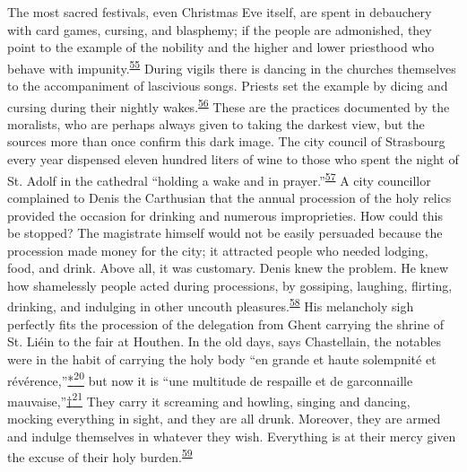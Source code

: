 The most sacred festivals, even Christmas Eve itself, are spent in
debauchery with card games, cursing, and blasphemy; if the people are
admonished, they point to the example of the nobility and the higher and
lower priesthood who behave with
impunity.\textsuperscript{\protect\hypertarget{13_Chapter_Six__THE_DEPICTION_OF_TH.xhtmlux5cux23id_1161}{\protect\hyperlink{23_NOTES.xhtmlux5cux23id_1162}{55}}}
\protect\hypertarget{13_Chapter_Six__THE_DEPICTION_OF_TH.xhtmlux5cux23page_184}{}{}During
vigils there is dancing in the churches themselves to the accompaniment
of lascivious songs. Priests set the example by dicing and cursing
during their nightly
wakes.\textsuperscript{\protect\hypertarget{13_Chapter_Six__THE_DEPICTION_OF_TH.xhtmlux5cux23id_1159}{\protect\hyperlink{23_NOTES.xhtmlux5cux23id_1160}{56}}}
These are the practices documented by the moralists, who are perhaps
always given to taking the darkest view, but the sources more than once
confirm this dark image. The city council of Strasbourg every year
dispensed eleven hundred liters of wine to those who spent the night of
St. Adolf in the cathedral ``holding a wake and in
prayer.''\textsuperscript{\protect\hypertarget{13_Chapter_Six__THE_DEPICTION_OF_TH.xhtmlux5cux23id_1157}{\protect\hyperlink{23_NOTES.xhtmlux5cux23id_1158}{57}}}
A city councillor complained to Denis the Carthusian that the annual
procession of the holy relics provided the occasion for drinking and
numerous improprieties. How could this be stopped? The magistrate
himself would not be easily persuaded because the procession made money
for the city; it attracted people who needed lodging, food, and drink.
Above all, it was customary. Denis knew the problem. He knew how
shamelessly people acted during processions, by gossiping, laughing,
flirting, drinking, and indulging in other uncouth
pleasures.\textsuperscript{\protect\hypertarget{13_Chapter_Six__THE_DEPICTION_OF_TH.xhtmlux5cux23id_1155}{\protect\hyperlink{23_NOTES.xhtmlux5cux23id_1156}{58}}}
His melancholy sigh perfectly fits the procession of the delegation from
Ghent carrying the shrine of St. Liéin to the fair at Houthen. In the
old days, says Chastellain, the notables were in the habit of carrying
the holy body ``en grande et haute solempnité et
révérence,''\protect\hypertarget{13_Chapter_Six__THE_DEPICTION_OF_TH.xhtmlux5cux23id_3027}{\protect\hyperlink{23_NOTES.xhtmlux5cux23id_3028}{*\textsuperscript{20}}}
but now it is ``une multitude de respaille et de garconnaille
mauvaise,''\protect\hypertarget{13_Chapter_Six__THE_DEPICTION_OF_TH.xhtmlux5cux23id_3029}{\protect\hyperlink{23_NOTES.xhtmlux5cux23id_3030}{†\textsuperscript{21}}}
They carry it screaming and howling, singing and dancing, mocking
everything in sight, and they are all drunk. Moreover, they are armed
and indulge themselves in whatever they wish. Everything is at their
mercy given the excuse of their holy
burden.\textsuperscript{\protect\hypertarget{13_Chapter_Six__THE_DEPICTION_OF_TH.xhtmlux5cux23id_1153}{\protect\hyperlink{23_NOTES.xhtmlux5cux23id_1154}{59}}}

